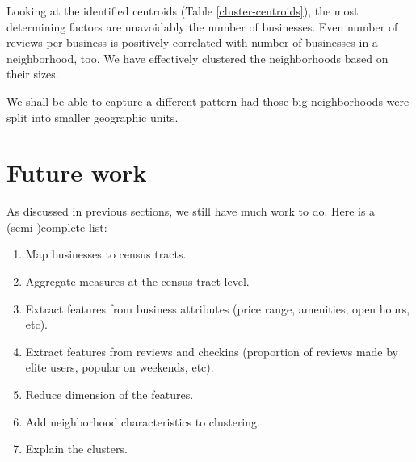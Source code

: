 \documentclass[draftclsnofoot]{IEEEtran}
\begin{document}
Looking at the identified centroids (Table \ref{cluster-centroids}), the most determining factors are unavoidably the number of businesses. Even number of reviews per business is positively correlated with number of businesses in a neighborhood, too. We have effectively clustered the neighborhoods based on their sizes.

We shall be able to capture a different pattern had those big neighborhoods were split into smaller geographic units.

\section{Future work}

As discussed in previous sections, we still have much work to do. Here is a (semi-)complete list:

\begin{enumerate}[label=\arabic*.]
	\item Map businesses to census tracts.
	\item Aggregate measures at the census tract level.
	\item Extract features from business attributes (price range, amenities, open hours, etc).
	\item Extract features from reviews and checkins (proportion of reviews made by elite users, popular on weekends, etc).
	\item Reduce dimension of the features.
	\item Add neighborhood characteristics to clustering.
	\item Explain the clusters.
\end{enumerate}
\end{document}
